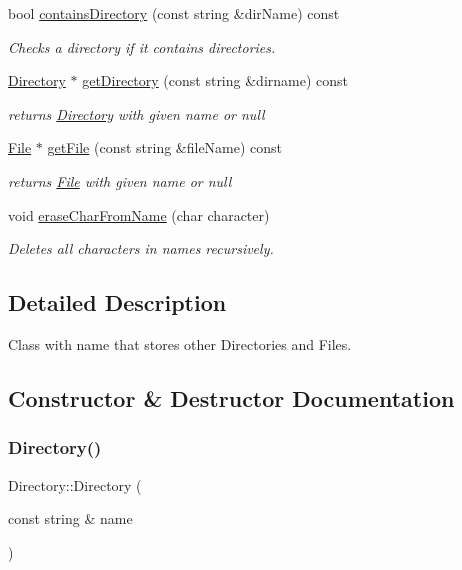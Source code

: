 \begin{DoxyCompactItemize}
bool \hyperlink{class_directory_ae84d7cdbbea5138b808dca098c28c820}{contains\+Directory} (const string \&dir\+Name) const
\begin{DoxyCompactList}\small\item\em Checks a directory if it contains directories. \end{DoxyCompactList}\item 
\hyperlink{class_directory}{Directory} $\ast$ \hyperlink{class_directory_a1deb0931a93badb556a4faed75cbc033}{get\+Directory} (const string \&dirname) const
\begin{DoxyCompactList}\small\item\em returns \hyperlink{class_directory}{Directory} with given name or null \end{DoxyCompactList}\item 
\hyperlink{class_file}{File} $\ast$ \hyperlink{class_directory_a3a7c1f0d955b7c3a73f6701db1fdf72b}{get\+File} (const string \&file\+Name) const
\begin{DoxyCompactList}\small\item\em returns \hyperlink{class_file}{File} with given name or null \end{DoxyCompactList}\item 
void \hyperlink{class_directory_ad8718bf810510f06e1932a8083ae09e2}{erase\+Char\+From\+Name} (char character)
\begin{DoxyCompactList}\small\item\em Deletes all characters in names recursively. \end{DoxyCompactList}\end{DoxyCompactItemize}


\subsection{Detailed Description}
Class with name that stores other Directories and Files. 

\subsection{Constructor \& Destructor Documentation}
\mbox{\label{class_directory_a0b019225671a50ead8dbb22b97667676}} 
\subsubsection{\texorpdfstring{Directory()}{Directory()}}
{\footnotesize\ttfamily Directory\+::\+Directory (\begin{DoxyParamCaption}\item[{const string \&}]{name }\end{DoxyParamCaption})\hspace{0.3cm}{\ttfamily [inline]}}

